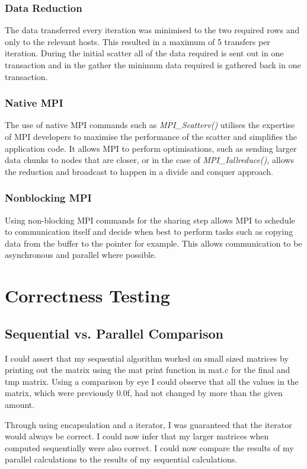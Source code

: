 \documentclass[a4paper,10pt]{report}
\begin{document}
\subsubsection{Data Reduction}
The data transferred every iteration was minimised to the two required rows and only to the relevant hosts. This resulted in a maximum of 5 transfers per iteration. During the initial scatter all of the data required is sent out in one transaction and in the gather the minimum data required is gathered back in one transaction.
\subsubsection{Native MPI}
The use of native MPI commands such as \emph{MPI\_Scatterv()} utilises the expertise of MPI developers to maximise the performance of the scatter and simplifies the application code. It allows MPI to perform optimisations, such as sending larger data chunks to nodes that are closer, or in the case of \emph{MPI\_Iallreduce()}, allows the reduction and broadcast to happen in a divide and conquer approach.
\subsubsection{Nonblocking MPI}
Using non-blocking MPI commands for the sharing step allows MPI to schedule to communication itself and decide when best to perform tasks such as copying data from the buffer to the pointer for example. This allows communication to be asynchronous and parallel where possible.

\section{Correctness Testing}
\subsection{Sequential vs. Parallel Comparison}
I could assert that my sequential algorithm worked on small sized matrices by printing out the matrix using the mat print function in mat.c for the final and tmp matrix. Using a comparison by eye I could observe that all the values in the matrix, which were previously 0.0f, had not changed by more than the given amount.

Through using encapsulation and a iterator, I was guaranteed that the iterator would always be correct. I could now infer that my larger matrices when computed sequentially were also correct. I could now compare the results of my parallel calculations to the results of my sequential calculations.
\end{document}
